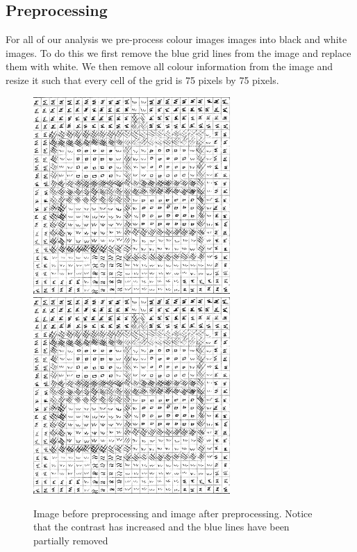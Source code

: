 \documentclass[preprint,3p,12pt]{elsarticle}
\begin{document}
\subsection{Preprocessing}
\label{process:preprocessing}

For all of our analysis we pre-process colour images images into black and white
images. To do this we first remove the blue grid lines from the image and
replace them with white. We then remove all colour information from the image
and resize it such that every cell of the grid is 75 pixels by 75 pixels.

\begin{figure}[h]
    \begin{center}
    \includegraphics[width=7.5cm, height=7.5cm]{preprocessing-inital}
    \includegraphics[width=7.5cm, height=7.5cm]{preprocessing-final}

    \caption{Image before preprocessing and image after preprocessing. Notice
        that the contrast has increased and the blue lines have been partially
        removed}

    \end{center}
\end{figure}
\end{document}
